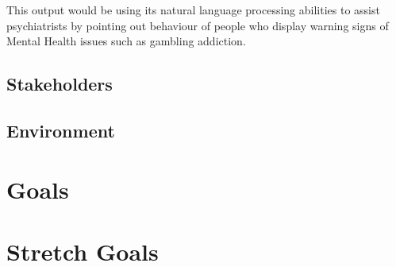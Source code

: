 \documentclass{article}
\begin{document}
This output would be using its natural language processing abilities to assist psychiatrists by pointing out behaviour of people who display warning signs of Mental Health issues such as gambling addiction.

\subsection{Stakeholders}

\subsection{Environment}


\section{Goals}

\section{Stretch Goals}
\end{document}
